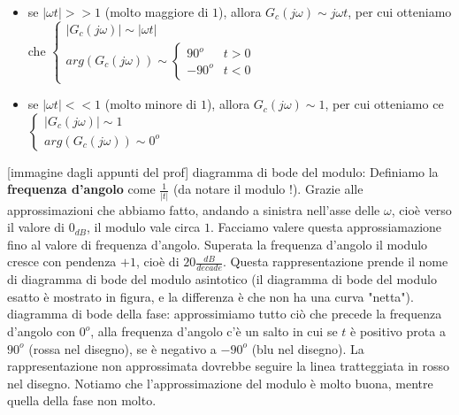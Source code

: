 \begin{itemize}
    \begin{itemize}
        \item se $| \omega t| >> 1$ (molto maggiore di $1$), allora $G_c(j \omega) \sim  j \omega t$, per cui otteniamo \newline che $\begin{cases}
            |G_c(j \omega)| \sim  | \omega t| \\
            arg(G_c(j \omega)) \sim  \begin{cases}
                90^o  \;\;& t>0\\
                -90^o & t <0
            \end{cases}
        \end{cases}$
        \item se $| \omega t| << 1$ (molto minore di $1$), allora $G_c(j \omega) \sim 1$, per cui otteniamo \newline ce $\begin{cases}
            |G_c(j \omega)| \sim  1 \\
            arg(G_c(j \omega)) \sim 0^o
        \end{cases}$
    \end{itemize}
    [immagine dagli appunti del prof]\newline \newline
    diagramma di bode del modulo: Definiamo la \textbf{frequenza d'angolo} come $\frac{1}{|t|}$ (da notare il modulo !). Grazie alle approssimazioni che abbiamo fatto, andando a sinistra nell'asse delle $\omega$, cioè verso il valore di $0 _{dB}$, il modulo vale circa $1$. Facciamo valere questa approssiamazione fino al valore di frequenza d'angolo. Superata la frequenza d'angolo il modulo cresce con pendenza $+1$, cioè di $20 \frac{dB}{decade}$. Questa rappresentazione prende il nome di diagramma di bode del modulo asintotico (il diagramma di bode del modulo esatto è mostrato in figura, e la differenza è che non ha una curva "netta").\newline \newline
    diagramma di bode della fase: approssimiamo tutto ciò che precede la frequenza d'angolo con $0^o$, alla frequenza d'angolo c'è un salto in cui se $t$ è positivo prota a $90^o$ (rossa nel disegno), se è negativo a $-90^o$ (blu nel disegno). La rappresentazione non approssimata dovrebbe seguire la linea tratteggiata in rosso nel disegno.\newline
    \newline
    Notiamo che l'approssimazione del modulo è molto buona, mentre quella della fase non molto.

\end{itemize}
